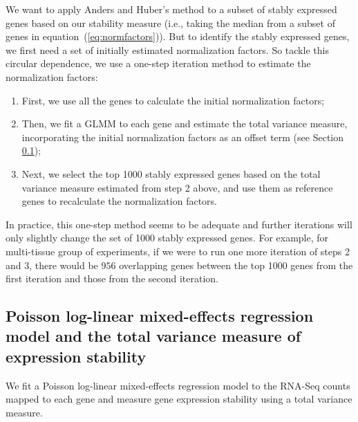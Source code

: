 \documentclass[letterpaper,12pt]{article}
\begin{document}
We want to apply Anders and Huber's method to a subset of stably expressed
genes based on our stability measure (i.e., taking the median from a subset of
genes in equation~(\ref{eq:normfactors})). But to identify the stably expressed
genes, we first need a set of initially estimated normalization factors.  So
tackle this circular dependence, we use a one-step iteration method to estimate the
normalization factors: 
\begin{enumerate}
    \item
	First, we use all the genes to calculate the initial normalization factors; 
    \item
	Then, we fit a GLMM to each gene and estimate the total variance measure, incorporating the initial normalization factors as
	an offset term (see Section \ref{subsection:OurMethod}); 
    \item
	Next, we select the top 1000 stably expressed genes based on the total
	variance measure estimated from step 2 above, and use them as
	reference genes to recalculate the normalization factors. 
\end{enumerate}
In practice, this one-step method seems to be adequate and further iterations
will only slightly change the set of 1000 stably expressed genes.  For
example, for multi-tissue group of experiments, if we were to run one more
iteration of steps 2 and 3, there would be $956$ overlapping genes between
the top 1000 genes from the first iteration and those from the second
iteration.



\subsection{Poisson log-linear mixed-effects regression model and the total
variance measure of expression stability}\label{subsection:OurMethod} 
We fit a Poisson log-linear mixed-effects regression model to the
RNA-Seq counts mapped to each gene and measure gene expression stability using
a total variance measure.
\end{document}
